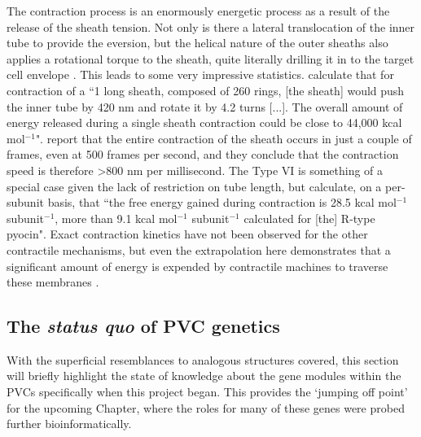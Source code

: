 The contraction process is an enormously energetic process as a result of the release of the sheath tension. Not only is there a lateral translocation of the inner tube to provide the eversion, but the helical nature of the outer sheaths also applies a rotational torque to the sheath, quite literally drilling it in to the target cell envelope \citep{Kube2015}. This leads to some very impressive statistics. \cite{Wang2017} calculate that for contraction of a ``1 \um{} long sheath, composed of 260 rings, [the sheath] would push the inner tube by 420 nm and rotate it by 4.2 turns [...]. The overall amount of energy released during a single sheath contraction could be close to 44,000 kcal mol$^{-1}$". \cite{Vettiger2017} report that the entire contraction of the sheath occurs in just a couple of frames, even at 500 frames per second, and they conclude that the contraction speed is therefore \textgreater 800 nm per millisecond. The Type VI is  something of a special case given the lack of restriction on tube length, but \cite{Wang2017} calculate, on a per-subunit basis, that ``the free energy gained during contraction is 28.5 kcal mol$^{-1}$ subunit$^{-1}$, more than 9.1 kcal mol$^{-1}$ subunit$^{-1}$ calculated for [the] R-type pyocin". Exact contraction kinetics have not been observed for the other contractile mechanisms, but even the extrapolation here demonstrates that a significant amount of energy is expended by contractile machines to traverse these membranes \citep{Brackmann2017}.


\subsection{The \emph{status quo} of PVC genetics}
With the superficial resemblances to analogous structures covered, this section will briefly highlight the state of knowledge about the gene modules within the PVCs specifically when this project began. This provides the `jumping off point' for the upcoming Chapter, where the roles for many of these genes were probed further bioinformatically.

